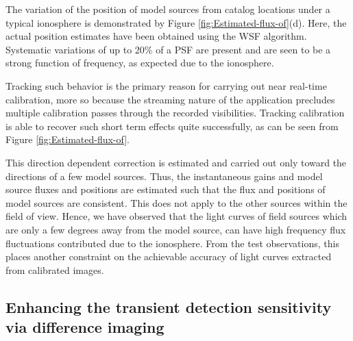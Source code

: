 \documentclass[referee]{aa}
\begin{document}
The variation  of the position of  model sources from catalog  locations under a
typical  ionosphere is  demonstrated  by Figure  \ref{fig:Estimated-flux-of}(d).
Here,  the  actual   position  estimates  have  been  obtained   using  the  WSF
algorithm. Systematic variations of up to 20\% of a PSF are present and are seen
to be a strong function of frequency, as expected due to the ionosphere.

Tracking such  behavior is the primary  reason for carrying  out near real-time
calibration, more so  because the streaming nature of  the application precludes
multiple  calibration   passes  through  the   recorded  visibilities.  Tracking
calibration is  able to recover such  short term effects  quite successfully, as
can be seen from Figure \ref{fig:Estimated-flux-of}.

This direction dependent correction is estimated and carried out only toward the
directions  of a  few model  sources. Thus,  the instantaneous  gains  and model
source fluxes  and positions are estimated  such that the flux  and positions of
model sources  are consistent. This does  not apply to the  other sources within
the  field of  view. Hence,  we have  observed that  the light  curves  of field
sources which are  only a few degrees  away from the model source,  can have high
frequency flux  fluctuations contributed  due to the  ionosphere. From  the test
observations, this places another constraint on the achievable accuracy of light
curves extracted from calibrated images.


\subsection{\label{sub:Enhancing-the-transient}Enhancing the transient detection
sensitivity via difference imaging} 
\end{document}
